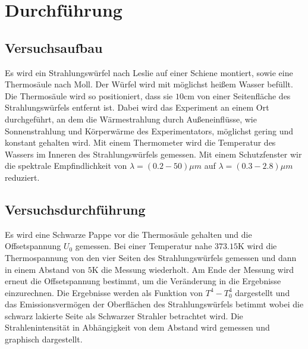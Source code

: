 \section{Durchführung}
\label{sec:Durchführung}
\subsection{Versuchsaufbau}
Es wird ein Strahlungswürfel nach Leslie auf einer Schiene montiert, sowie eine
Thermosäule nach Moll. Der Würfel wird mit möglichst heißem Wasser befüllt. Die
Thermosäule wird so positioniert, dass sie $10\si{\centi\meter}$ von einer
Seitenfläche des Strahlungswürfels entfernt ist. Dabei wird das Experiment an
einem Ort durchgeführt, an dem die Wärmestrahlung durch Außeneinflüsse, wie
Sonnenstrahlung und Körperwärme des Experimentators, möglichst gering und konstant
gehalten wird. Mit einem Thermometer wird die Temperatur des Wassers im Inneren
des Strahlungswürfels gemessen. Mit einem Schutzfenster wir die spektrale
Empfindlichkeit von $\lambda=(0.2-50)\mu m$ auf $\lambda=(0.3-2.8)\mu m$ reduziert.

\subsection{Versuchsdurchführung}
Es wird eine Schwarze Pappe vor die Thermosäule gehalten und die Offsetspannung
$U_0$ gemessen.
Bei einer Temperatur nahe $373.15\si{\kelvin}$ wird die Thermospannung von den vier
Seiten des Strahlungswürfels gemessen und dann in einem Abstand von $5\si{\kelvin}$ die
Messung wiederholt. Am Ende der Messung wird erneut die Offsetspannung bestimmt,
um die Veränderung in die Ergebnisse einzurechnen. Die Ergebnisse werden als
Funktion von $T^4-T_0^4$ dargestellt und das Emissionsvermögen der Oberflächen
des Strahlungswürfels betimmt wobei die schwarz lakierte Seite als
Schwarzer Strahler betrachtet wird.
Die Strahlenintensität in Abhängigkeit von dem Abstand wird gemessen und
graphisch dargestellt.
